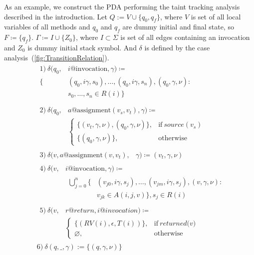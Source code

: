 As an example, we construct the PDA performing the taint tracking analysis described in the introduction.
Let $Q := V \cup \{q_0, q_f\}$, where $V$ is set of all local variables of all methods and $q_0$ and $q_f$ are dummy initial and final state, so $F \coloneqq \{q_f\}$.
$\Gamma \coloneqq I \cup \{Z_0\}$, where $I \subset \Sigma$ is set of all edges containing an invocation and $Z_0$ is dummy initial stack symbol.
And $\delta$ is defined by the case analysis~(\ref{fig:TransitionRelation}).
\begin{equation}
	\label{fig:TransitionRelation}
	\begin{split}
		&\begin{split}
			1)\ \delta(q_0, & i@\textrm{invocation}, \gamma) \coloneqq \\
			\{& (q_0, i\gamma, s_0), \ldots, (q_0, i\gamma, s_n), (q_0, \gamma, \nu): \\
			& s_0, \ldots, s_n \in R(i)\} \\
		\end{split} \\
		&\begin{split}
			2)\ \delta(q_0, & a@\textrm{assignment} (v_s, v_t), \gamma) \coloneqq \\
			&\begin{cases}
				\{(v_t, \gamma, \nu), (q_0, \gamma, \nu)\},& \textrm{if}\ \textit{source}(v_s) \\
				\{(q_0, \gamma, \nu)\},& \textrm{otherwise}
			\end{cases}
		\end{split} \\
		&\begin{split}
			3)\ \delta(v, a@\textrm{assignment}(v, v_t), & \gamma) \coloneqq {(v_t, \gamma, \nu)}
		\end{split} \\
		&\begin{split}
			4)\ \delta(v, & i@\textrm{invocation}, \gamma) \coloneqq \\
			&\begin{split}
				\bigcup_{j=0}^{n} \{&(v_{j0}, i\gamma, s_j), \ldots, (v_{jm}, i\gamma, s_j), (v, \gamma, \nu): \\
				& v_{jk} \in A(i, j, v)\}, s_j \in R(i)
			\end{split}
		\end{split} \\
		&\begin{split}
			5)\ \delta(v, & r@return, i@invocation) \coloneqq \\
			&\begin{cases}
				\{(RV(i), \epsilon, T(i))\},& \textrm{if}\ \textit{returned(v)} \\
				\varnothing, & \textrm{otherwise}
			\end{cases}
		\end{split} \\
		& 6)\ \delta(q, \_, \gamma) := \{(q, \gamma, \nu)\}
	\end{split}
\end{equation}
